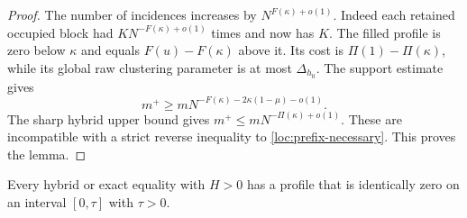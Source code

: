 \begin{proof}
The number of incidences increases by
$N^{F(\kappa)+o(1)}$.  Indeed each retained occupied block had
$KN^{-F(\kappa)+o(1)}$ times and now has $K$.  The filled profile
is zero below $\kappa$ and equals $F(u)-F(\kappa)$ above it.
Its cost is $\Pi(1)-\Pi(\kappa)$, while its global raw clustering
parameter is at most $\Delta_{h_0}$.  The support estimate gives
\[
 m^+\geq
 mN^{-F(\kappa)-2\kappa(1-\mu)-o(1)}.
\]
The sharp hybrid upper bound gives
$m^+\leq mN^{-\Pi(\kappa)+o(1)}$.
These are incompatible with a strict reverse inequality to
\eqref{loc:prefix-necessary}.  This proves the lemma.
\end{proof}

\begin{lemma}
\label{lem:flat-delay}
Every hybrid or exact equality with $H>0$ has a profile that is
identically zero on an interval $[0,\tau]$ with $\tau>0$.
\end{lemma}

